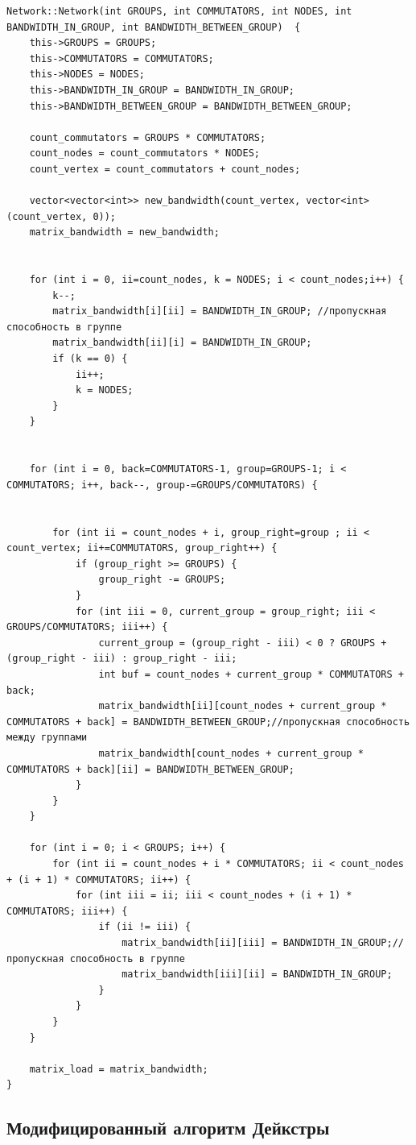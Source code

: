 \documentclass[11pt,a4paper,final]{article} %
\begin{document}
\begin{lstlisting}[label=lst1, caption = Конструктор класса Network]
Network::Network(int GROUPS, int COMMUTATORS, int NODES, int BANDWIDTH_IN_GROUP, int BANDWIDTH_BETWEEN_GROUP)  {
	this->GROUPS = GROUPS;
	this->COMMUTATORS = COMMUTATORS;
	this->NODES = NODES;
	this->BANDWIDTH_IN_GROUP = BANDWIDTH_IN_GROUP;
	this->BANDWIDTH_BETWEEN_GROUP = BANDWIDTH_BETWEEN_GROUP;
	
	count_commutators = GROUPS * COMMUTATORS; 
	count_nodes = count_commutators * NODES; 
	count_vertex = count_commutators + count_nodes;
	
	vector<vector<int>> new_bandwidth(count_vertex, vector<int>(count_vertex, 0));
	matrix_bandwidth = new_bandwidth;
	
	
	for (int i = 0, ii=count_nodes, k = NODES; i < count_nodes;i++) {
		k--;
		matrix_bandwidth[i][ii] = BANDWIDTH_IN_GROUP; //пропускная способность в группе
		matrix_bandwidth[ii][i] = BANDWIDTH_IN_GROUP;
		if (k == 0) {
			ii++;
			k = NODES;
		}	
	}
	
	
	for (int i = 0, back=COMMUTATORS-1, group=GROUPS-1; i < COMMUTATORS; i++, back--, group-=GROUPS/COMMUTATORS) {
		
		
		for (int ii = count_nodes + i, group_right=group ; ii < count_vertex; ii+=COMMUTATORS, group_right++) {
			if (group_right >= GROUPS) {
				group_right -= GROUPS;
			}
			for (int iii = 0, current_group = group_right; iii < GROUPS/COMMUTATORS; iii++) {
				current_group = (group_right - iii) < 0 ? GROUPS + (group_right - iii) : group_right - iii;
				int buf = count_nodes + current_group * COMMUTATORS + back; 
				matrix_bandwidth[ii][count_nodes + current_group * COMMUTATORS + back] = BANDWIDTH_BETWEEN_GROUP;//пропускная способность между группами
				matrix_bandwidth[count_nodes + current_group * COMMUTATORS + back][ii] = BANDWIDTH_BETWEEN_GROUP;
			}
		}
	}
	
	for (int i = 0; i < GROUPS; i++) {
		for (int ii = count_nodes + i * COMMUTATORS; ii < count_nodes + (i + 1) * COMMUTATORS; ii++) {
			for (int iii = ii; iii < count_nodes + (i + 1) * COMMUTATORS; iii++) {
				if (ii != iii) {
					matrix_bandwidth[ii][iii] = BANDWIDTH_IN_GROUP;//пропускная способность в группе
					matrix_bandwidth[iii][ii] = BANDWIDTH_IN_GROUP;
				}
			}
		}
	}
	
	matrix_load = matrix_bandwidth;
}
\end{lstlisting}

\subsection{Модифицированный алгоритм Дейкстры}
\end{document}
